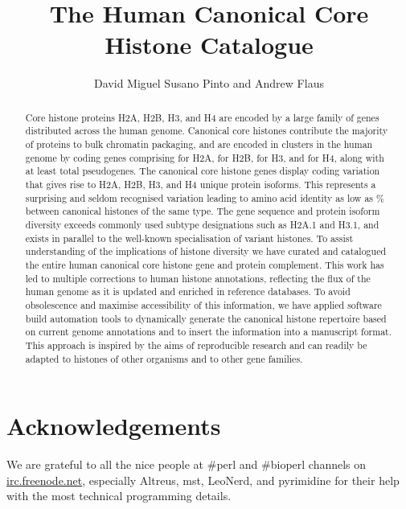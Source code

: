 \documentclass[10pt,a4paper,onecolumn,article,draft]{memoir}
\author{David Miguel Susano Pinto and Andrew Flaus}
\title{The Human Canonical Core Histone Catalogue}
\begin{document}
  \maketitle

  \begin{abstract}
    Core histone proteins H2A, H2B, H3, and H4 are encoded
    by a large family of genes distributed across the human genome.
    Canonical core histones contribute the majority of proteins to bulk
    chromatin packaging,
    and are encoded in \NumberOfClusters{} clusters in the human genome
    by \TotalCoreCodingGenes{} coding genes comprising
    \HTwoACodingGenes{} for H2A,
    \HTwoBCodingGenes{} for H2B,
    \HThreeCodingGenes{} for H3,
    and \HFourCodingGenes{} for H4,
    along with at least \TotalCorePseudoGenes{} total pseudogenes.
    The canonical core histone genes display coding variation that gives rise to
    \HTwoAUniqueProteins{} H2A, \HTwoBUniqueProteins{} H2B,
    \HThreeUniqueProteins{} H3, and \HFourUniqueProteins{} H4 unique protein isoforms.
    This represents a surprising and seldom recognised variation
    leading to amino acid identity as low as
     \result{}\%
    between canonical histones of the same type.
    The gene sequence and protein isoform diversity
    exceeds commonly used subtype designations such as H2A.1 and H3.1,
    and exists in parallel to the well-known specialisation of variant histones.
    To assist understanding of the implications of histone diversity
    we have curated and catalogued the entire human canonical core
    histone gene and protein complement.
    This work has led to multiple corrections to human histone annotations,
    reflecting the flux of the human genome as it is updated and
    enriched in reference databases.
    To avoid obsolescence and maximise accessibility of this information,
    we have applied software build automation tools to
    dynamically generate the canonical histone repertoire
    based on current genome annotations and to insert the information
    into a manuscript format.
    This approach is inspired by the aims of reproducible research
    and can readily be adapted to histones of other organisms and
    to other gene families.
  \end{abstract}

  
  
  
  
  
  
  

  \section{Acknowledgements}
    We are grateful to all the nice people at \#perl and \#bioperl channels on
    \url{irc.freenode.net}, especially Altreus, mst, LeoNerd, and pyrimidine for
    their help with the most technical programming details.

  

  \newpage
  \appendix
  
\end{document}
